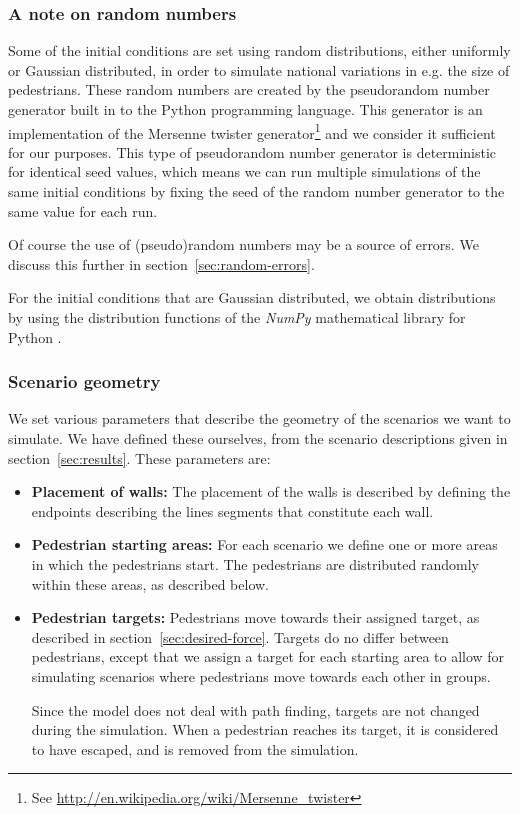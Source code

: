 \subsubsection{A note on random numbers}
Some of the initial conditions are set using random distributions, either 
uniformly or Gaussian distributed, in order to simulate national variations in 
e.g. the size of pedestrians.  These random numbers are created by the 
pseudorandom number generator built in to the Python programming language.  
This generator is an implementation of the Mersenne twister 
generator\footnote{See \url{http://en.wikipedia.org/wiki/Mersenne\_twister}} 
and we consider it sufficient for our purposes. This type of pseudorandom 
number generator is deterministic for identical seed values, which means we 
can run multiple simulations of the same initial conditions by fixing the seed 
of the random number generator to the same value for each run.

Of course the use of (pseudo)random numbers may be a source of errors. We 
discuss this further in section~\ref{sec:random-errors}.

For the initial conditions that are Gaussian distributed, we obtain 
distributions by using the distribution functions of the \emph{NumPy} 
mathematical library for Python \cite{numpy}.

\subsubsection{Scenario geometry}
We set various parameters that describe the geometry of the scenarios we want 
to simulate. We have defined these ourselves, from the scenario descriptions 
given in section~\ref{sec:results}. These parameters are:

\begin{itemize}
    \item \textbf{Placement of walls:} The placement of the walls is described 
        by defining the endpoints describing the lines segments that 
        constitute each wall.

    \item \textbf{Pedestrian starting areas:} For each scenario we define one 
        or more areas in which the pedestrians start. The pedestrians are 
        distributed randomly within these areas, as described below.

    \item \textbf{Pedestrian targets:}  Pedestrians move towards their 
        assigned target, as described in section~\ref{sec:desired-force}. 
        Targets do no differ between pedestrians, except that we assign a 
        target for each starting area to allow for simulating scenarios where 
        pedestrians move towards each other in groups.

        Since the model does not deal with path finding, targets are not 
        changed during the simulation. When a pedestrian reaches its target, 
        it is considered to have escaped, and is removed from the simulation.
\end{itemize}


